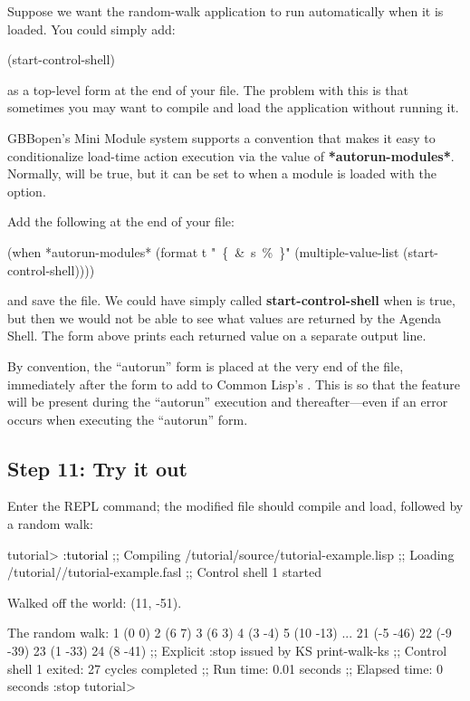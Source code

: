 \documentclass[10pt,twoside,english,pdftex]{article}
\begin{document}
Suppose we want the random-walk application to run automatically when it is
loaded.  You could simply add:
% 
\W\supp
\begin{example}
\textcolor{darkergray}{%
  (start-control-shell)}
\end{example}
%
as a top-level form at the end of your  file.  The
problem with this is that sometimes you may want to compile and load the
application without running it.  

GBBopen's Mini Module system supports a convention that makes it easy to
conditionalize load-time action execution via the value of
\textbf{*autorun-modules*}.  Normally,  will be
true, but it can be set to \nil{} when a module is loaded with the
 option.

Add the following at the end of your 
file:
% 
\W\supp
\begin{example}
  (when *autorun-modules* 
    (format t "~\{~\&~s~\%~\}" (multiple-value-list (start-control-shell))))
\end{example}
%
and save the file.  We could have simply called \textbf{start-control-shell}
when  is true, but then we would not be able to see
what values are returned by the Agenda Shell.  The  form above
prints each returned value on a separate output line.

By convention, the ``autorun'' form is placed at the very end of the file,
immediately after the form to add  to Common Lisp's
.  This is so that the  feature will be
present during the ``autorun'' execution and thereafter---even if an error
occurs when executing the ``autorun'' form.

\subsection*{Step 11: Try it out}

Enter the  REPL command; the modified
 file should compile and load, followed by a
random walk:
%
\W\supp
\begin{example}
\textcolor{darkergray}{%
  tutorial> \textcolor{black}{:tutorial}
  ;; Compiling /tutorial/source/tutorial-example.lisp
  ;; Loading /tutorial//tutorial-example.fasl
  ;; Control shell 1 started

  Walked off the world: (11, -51).

  The random walk:
  1 (0 0)
  2 (6 7)
  3 (6 3)
  4 (3 -4)
  5 (10 -13)
     ...
  21 (-5 -46)
  22 (-9 -39)
  23 (1 -33)
  24 (8 -41)
  ;; Explicit :stop issued by KS print-walk-ks
  ;; Control shell 1 exited: 27 cycles completed
  ;; Run time: 0.01 seconds
  ;; Elapsed time: 0 seconds
  :stop
  tutorial>}
\end{example}
\end{document}
